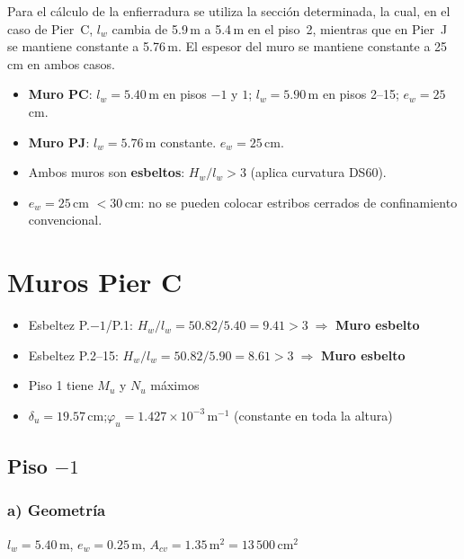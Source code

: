 Para el cálculo de la enfierradura se utiliza la sección determinada, la cual, en el caso de
Pier~C, $l_w$ cambia de 5.9\,m a 5.4\,m en el piso~2, mientras que en Pier~J se mantiene
constante a 5.76\,m. El espesor del muro se mantiene constante a 25\,cm en ambos casos.

\begin{itemize}
  \item \textbf{Muro PC}: $l_w=5.40$\,m en pisos $-1$ y $1$; $l_w=5.90$\,m en pisos 2--15;
        $e_w=25$\,cm.
  \item \textbf{Muro PJ}: $l_w=5.76$\,m constante. $e_w=25$\,cm.
  \item Ambos muros son \textbf{esbeltos}: $H_w/l_w > 3$ (aplica curvatura DS60).
  \item $e_w=25$\,cm $<30$\,cm: no se pueden colocar estribos cerrados de confinamiento
        convencional.
\end{itemize}

\section{Muros Pier C}

\begin{itemize}
    \item Esbeltez P.$-1$/P.1: $H_w/l_w=50.82/5.40=9.41>3\;\Rightarrow$ \textbf{Muro esbelto}
    \item Esbeltez P.2--15: $H_w/l_w=50.82/5.90=8.61>3\;\Rightarrow$ \textbf{Muro esbelto}
    \item Piso 1 tiene $M_u$ y $N_u$ máximos
    \item $\delta_u = 19.57$\,cm;\quad $\varphi_u = 1.427\times10^{-3}$\,m$^{-1}$
          (constante en toda la altura)
\end{itemize}

\subsection{Piso $-1$}

\subsubsection*{a) Geometría}
$l_w=5.40$\,m,\; $e_w=0.25$\,m,\; $A_{cv}=1.35$\,m$^2=13\,500$\,cm$^2$


